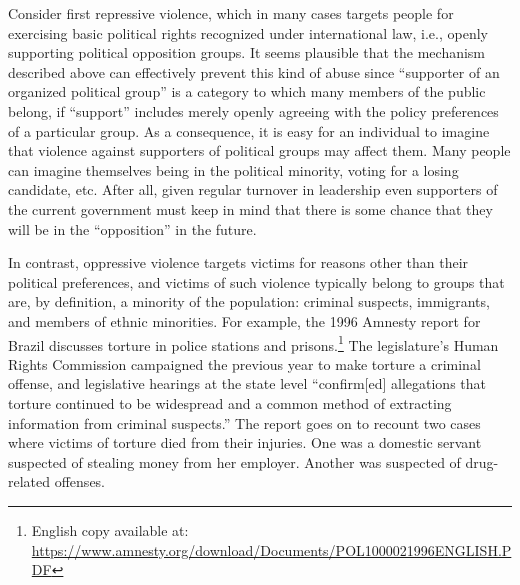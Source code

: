 \documentclass[11pt]{article}
\begin{document}
Consider first repressive violence, which in many cases targets people for exercising basic political rights recognized under international law, i.e., openly supporting political opposition groups. It seems plausible that the mechanism described above can effectively prevent this kind of abuse since ``supporter of an organized political group'' is a category to which many members of the public belong, if ``support'' includes merely openly agreeing with the policy preferences of a particular group. As a consequence, it is easy for an individual to imagine that violence against supporters of political groups may affect them. Many people can imagine themselves being in the political minority, voting for a losing candidate, etc. After all, given regular turnover in leadership even supporters of the current government must keep in mind that there is some chance that they will be in the ``opposition'' in the future. 

In contrast, oppressive violence targets victims for reasons other than their political preferences, and victims of such violence typically belong to groups that are, by definition, a minority of the population: criminal suspects, immigrants, and members of ethnic minorities. For example, the 1996 Amnesty report for Brazil discusses torture in police stations and prisons.\footnote{English copy available at: \url{https://www.amnesty.org/download/Documents/POL1000021996ENGLISH.PDF}} The legislature's Human Rights Commission campaigned the previous year to make torture a criminal offense, and legislative hearings at the state level ``confirm[ed] allegations that torture continued to be widespread and a common method of extracting information from criminal suspects.'' The report goes on to recount two cases where victims of torture died from their injuries. One was a domestic servant suspected of stealing money from her employer. Another was suspected of drug-related offenses. 
\end{document}
